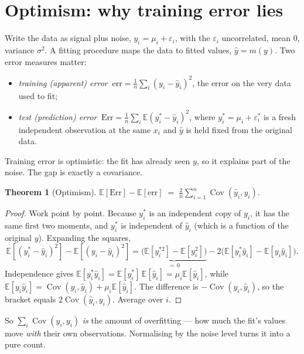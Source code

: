 \documentclass[11pt]{article}
\DeclareMathOperator{\Cov}{Cov}
\newcommand{\E}{\mathbb{E}}
\newcommand{\yhat}{\hat y}
\theoremstyle{definition}
\theoremstyle{plain}
\newtheorem{theorem}{Theorem}
\begin{document}
\section{Optimism: why training error lies}

Write the data as signal plus noise, $y_i = \mu_i + \varepsilon_i$, with the
$\varepsilon_i$ uncorrelated, mean $0$, variance $\sigma^2$. A fitting procedure
maps the data to fitted values, $\yhat = m(y)$. Two error measures matter:

\begin{itemize}[nosep,leftmargin=1.4em]
\item \emph{training (apparent) error} $\ \mathrm{err}=\tfrac1n\sum_i (y_i-\yhat_i)^2$,
the error on the very data used to fit;
\item \emph{test (prediction) error} $\ \mathrm{Err}=\tfrac1n\sum_i \E(y_i^\ast-\yhat_i)^2$,
where $y_i^\ast=\mu_i+\varepsilon_i^\ast$ is a fresh independent observation at the
same $x_i$ and $\yhat$ is held fixed from the original data.
\end{itemize}

Training error is optimistic: the fit has already seen $y$, so it explains part
of the noise. The gap is exactly a covariance.

\begin{theorem}[Optimism]\label{thm:optimism}
$\displaystyle \E[\mathrm{Err}] - \E[\mathrm{err}] \;=\; \frac{2}{n}\sum_{i=1}^n \Cov(\yhat_i, y_i).$
\end{theorem}

\begin{proof}
Work point by point. Because $y_i^\ast$ is an independent copy of $y_i$, it has the
same first two moments, and $y_i^\ast$ is independent of $\yhat_i$ (which is a
function of the original $y$). Expanding the squares,
\[
\E[(y_i^\ast-\yhat_i)^2]-\E[(y_i-\yhat_i)^2]
= \underbrace{\big(\E[y_i^{\ast2}]-\E[y_i^2]\big)}_{=\,0}
- 2\big(\E[y_i^\ast \yhat_i]-\E[y_i \yhat_i]\big).
\]
Independence gives $\E[y_i^\ast \yhat_i]=\E[y_i^\ast]\,\E[\yhat_i]=\mu_i\E[\yhat_i]$,
while $\E[y_i \yhat_i]=\Cov(y_i,\yhat_i)+\mu_i\E[\yhat_i]$. The difference is
$-\Cov(y_i,\yhat_i)$, so the bracket equals $2\Cov(\yhat_i,y_i)$. Average over $i$.
\end{proof}

So $\sum_i \Cov(\yhat_i,y_i)$ \emph{is} the amount of overfitting --- how much the
fit's values move \emph{with} their own observations. Normalising by the noise
level turns it into a pure count.
\end{document}
